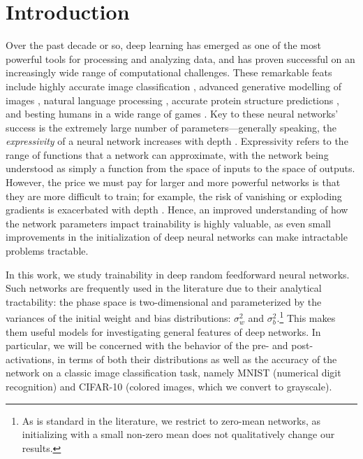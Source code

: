 \section{Introduction}
Over the past decade or so, deep learning has emerged as one of the most powerful tools for processing and analyzing data, and has proven successful on an increasingly wide range of computational challenges. These remarkable feats include highly accurate image classification \cite{NIPS2012_c399862d}, advanced generative modelling of images \cite{2021arXiv210212092R}, natural language processing \cite{2020arXiv200514165B}, accurate protein structure predictions \cite{Jumper:2021wp}, and besting humans in a wide range of games \cite{Schrittwieser:2020ti}. Key to these neural networks' success is the extremely large number of parameters---generally speaking, the \emph{expressivity} of a neural network increases with depth \cite{2016arXiv160605336R}. Expressivity refers to the range of functions that a network can approximate, with the network being understood as simply a function from the space of inputs to the space of outputs. However, the price we must pay for larger and more powerful networks is that they are more difficult to train; for example, the risk of vanishing or exploding gradients is exacerbated with depth \cite{geron2019hands}. Hence, an improved understanding of how the network parameters impact trainability is highly valuable, as even small improvements in the initialization of deep neural networks can make intractable problems tractable.

In this work, we study trainability in deep random feedforward neural networks. Such networks are frequently used in the literature due to their analytical tractability: the phase space is two-dimensional and parameterized by the variances of the initial  weight and bias distributions: $\sigma_w^2$ and $\sigma_b^2$.\footnote{As is standard in the literature, we restrict to zero-mean networks, as initializing with a small non-zero mean does not qualitatively change our results.} This makes them useful models for investigating general features of deep networks. In particular, we will be concerned with the behavior of the pre- and post-activations, in terms of both their distributions as well as the accuracy of the network on 
a classic image classification task, namely MNIST (numerical digit recognition) and CIFAR-10 (colored images, which we convert to grayscale).

